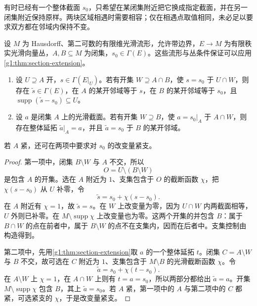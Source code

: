\ProseParagraphBreak

有时已经有一个整体截面 \(s_0\)，只希望在某闭集附近把它换成指定截面，并在另一闭集附近保持原样。两块区域相遇时需要相容；仅在相遇点取值相同，未必足以要求双方都在邻域内保持不变。

\begin{proposition}\label{g1:prop:relative-section-extension}
	设 \(M\) 为 Hausdorff、第二可数的有限维光滑流形，允许带边界，\(E\to M\) 为有限秩实光滑向量丛，\(A,B\subseteq M\) 为闭集，\(s_0\in\Gamma(E)\)。这些流形与丛条件保证可以应用\cref{g1:thm:section-extension}。
	\begin{enumerate}
		\item 设 \(U\supseteq A\) 开，\(s\in\Gamma(E|_U)\)。若有开集 \(W\supseteq A\cap B\)，使 \(s=s_0\) 于 \(U\cap W\)，则存在 \(\widetilde s\in\Gamma(E)\)，在 \(A\) 的某开邻域等于 \(s\)，在 \(B\) 的某开邻域等于 \(s_0\)，且 \(\operatorname{supp}(\widetilde s-s_0)\subseteq U\)。
		\item 设 \(a\) 是闭集 \(A\) 上的光滑截面。若有开集 \(W\supseteq B\)，使 \(a=s_0|_A\) 于 \(A\cap W\)，则存在整体延拓 \(\widetilde a|_A=a\)，并且 \(\widetilde a=s_0\) 于 \(B\) 的某开邻域。
	\end{enumerate}
	若 \(A\) 紧，还可在两项中要求对 \(s_0\) 的改变量紧支。
\end{proposition}
\begin{proof}
	第一项中，闭集 \(B\setminus W\) 与 \(A\) 不交，所以
	\[
		O=U\setminus(B\setminus W)
	\]
	是包含 \(A\) 的开集。选在 \(A\) 附近为 \(1\)、支集包含于 \(O\) 的截断函数 \(\chi\)，把 \(\chi(s-s_0)\) 从 \(U\) 补零，令
	\[
		\widetilde s=s_0+\chi(s-s_0).
	\]
	在 \(A\) 附近有 \(\chi=1\)，故 \(\widetilde s=s\)。在 \(W\) 上改变量为零，因为 \(U\cap W\) 内两截面相等，\(U\) 外则已补零。在 \(M\setminus\operatorname{supp}\chi\) 上改变量也为零。这两个开集的并包含 \(B\)：属于 \(B\cap W\) 的点在前者中，属于 \(B\setminus W\) 的点不在支集内，因而在后者中。支集控制由构造得到。

	第二项中，先用\cref{g1:thm:section-extension}取 \(a\) 的一个整体延拓 \(t\)。闭集 \(C=A\setminus W\) 与 \(B\) 不交，故可选在 \(C\) 附近为 \(1\)、支集包含于 \(M\setminus B\) 的光滑截断函数 \(\chi\)。令
	\[
		\widetilde a=s_0+\chi(t-s_0).
	\]
	在 \(A\setminus W\) 上 \(\chi=1\)，在 \(A\cap W\) 上则有 \(t=a=s_0\)，所以两部分都给出 \(\widetilde a=a\)。开集 \(M\setminus\operatorname{supp}\chi\) 包含 \(B\)，其上 \(\widetilde a=s_0\)。若 \(A\) 紧，第一项中的 \(A\) 与第二项中的 \(C\) 都紧，可选紧支的 \(\chi\)，于是改变量紧支。
\end{proof}

